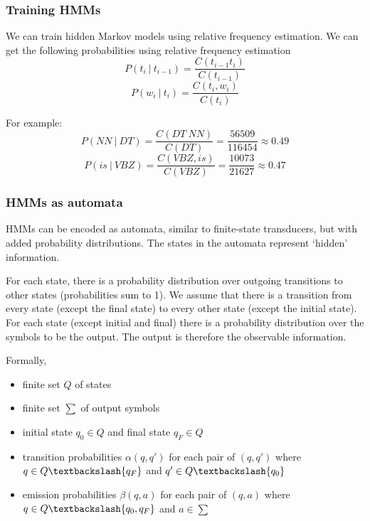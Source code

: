 \documentclass[Report.tex]{subfiles}
\begin{document}
\subsubsection{Training HMMs}
We can train hidden Markov models using relative frequency estimation.
We can get the following probabilities using relative frequency estimation
\begin{equation}
P(t_i\ |\ t_{i-1}) = \frac{C(t_{i-1}t_i)}{C(t_{i-1})}
\end{equation}
\begin{equation}
P(w_i\ |\ t_i) = \frac{C(t_i, w_i)}{C(t_i)}
\end{equation}

For example:
\begin{equation}
P(NN\ |\ DT) = \frac{C(DT\ NN)}{C(DT)} = \frac{56509}{116454} \approx 0.49
\end{equation}
\begin{equation}
P(is\ |\ VBZ) = \frac{C(VBZ, is)}{C(VBZ)} = \frac{10073}{21627} \approx 0.47
\end{equation}

\subsubsection{HMMs as automata}
HMMs can be encoded as automata, similar to finite-state transducers, but with
added probability distributions. The states in the automata represent `hidden'
information.

For each state, there is a probability distribution over outgoing transitions 
to other states (probabilities sum to 1). We assume that there is a transition
from every state (except the final state) to every other state (except the
initial state). For each state (except initial and final) there is a 
probability distribution over the symbols to be the output. The output is
therefore the observable information.

Formally,
\begin{itemize}
\item finite set $Q$ of states
\item finite set $\sum$ of output symbols
\item initial state $q_0 \in Q$ and final state $q_F \in Q$
\item transition probabilities $\alpha(q, q')$ for each pair of $(q,q')$ where
$q \in Q \textbackslash \{q_F\}$ and $q' \in Q \textbackslash \{q_0\}$
\item emission probabilities $\beta(q, a)$ for each pair of $(q, a)$ where
$q \in Q \textbackslash \{q_0, q_F\}$ and $a \in \sum$
\end{itemize}
\end{document}

